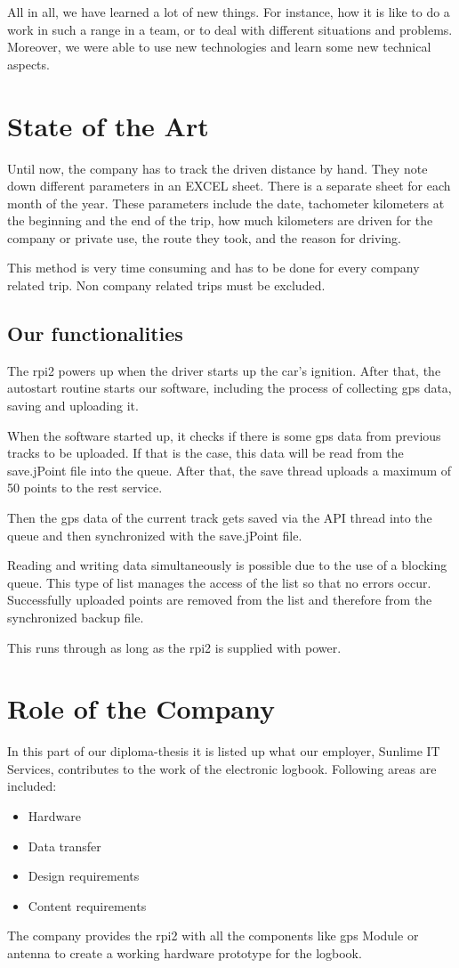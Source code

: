 All in all, we have learned a lot of new things. For instance, how it is like to do a work in such a range in a team, or to deal with different situations and problems. Moreover, we were able to use new technologies and learn some new technical aspects.
\newpage
\section*{State of the Art}
Until now, the company has to track the driven distance by hand. They note down different parameters in an EXCEL sheet. There is a separate sheet for each month of the year. These parameters include the date, tachometer kilometers at the beginning and the end of the trip, how much kilometers are driven for the company or private use, the route they took, and the reason for driving.

This method is very time consuming and has to be done for every company related trip. Non company related trips must be excluded.
\subsection*{Our functionalities}
The \gls{rpi2} powers up when the driver starts up the car's ignition. After that, the autostart routine starts our software, including the process of collecting \gls{gps} data, saving and uploading it.

When the software started up, it checks if there is some \gls{gps} data from previous tracks to be uploaded. If that is the case, this data will be read from the save.jPoint file into the queue. After that, the save thread uploads a maximum of 50 points to the \gls{rest} service. 


Then the \gls{gps} data of the current track gets saved via the API thread into the queue and then synchronized with the save.jPoint file.

Reading and writing data simultaneously is possible due to the use of a blocking queue. This type of list manages the access of the list so that no errors occur.\newline
Successfully uploaded points are removed from the list and therefore from the synchronized backup file.

This runs through as long as the \gls{rpi2} is supplied with power.


\newpage
\section*{Role of the Company}
In this part of our diploma-thesis it is listed up what our employer, Sunlime IT Services, contributes to the work of the electronic logbook. Following areas are included:
\begin{itemize}
\item Hardware
\item Data transfer
\item Design requirements
\item Content requirements
\end{itemize}
The company provides the \gls{rpi2} with all the components like \gls{gps} Module or antenna to create a working hardware prototype for the logbook.

